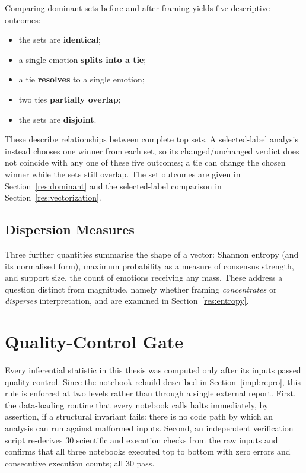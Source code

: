 Comparing dominant sets before and after framing yields five descriptive outcomes:

\begin{itemize}
    \item the sets are \textbf{identical};
    \item a single emotion \textbf{splits into a tie};
    \item a tie \textbf{resolves} to a single emotion;
    \item two ties \textbf{partially overlap};
    \item the sets are \textbf{disjoint}.
\end{itemize}

\noindent
These describe relationships between complete top sets. A selected-label analysis instead
chooses one winner from each set, so its changed/unchanged verdict does not coincide with any one
of these five outcomes; a tie can change the chosen winner while the sets still overlap. The set
outcomes are given in Section~\ref{res:dominant} and the selected-label comparison in
Section~\ref{res:vectorization}.

\subsection{Dispersion Measures}
\label{impl:dispersion}

\noindent
Three further quantities summarise the shape of a vector: Shannon entropy (and its normalised
form), maximum probability as a measure of consensus strength, and support size, the count of
emotions receiving any mass. These address a question distinct from magnitude, namely whether
framing \emph{concentrates} or \emph{disperses} interpretation, and are examined in
Section~\ref{res:entropy}.

\section{Quality-Control Gate}
\label{impl:qc}

\noindent
Every inferential statistic in this thesis was computed only after its inputs passed quality
control. Since the notebook rebuild described in Section~\ref{impl:repro}, this rule is enforced
at two levels rather than through a single external report. First, the data-loading routine that
every notebook calls halts immediately, by assertion, if a structural invariant fails: there is no
code path by which an analysis can run against malformed inputs. Second, an independent
verification script re-derives 30 scientific and execution checks from the raw inputs and confirms
that all three notebooks executed top to bottom with zero errors and consecutive execution counts;
all 30 pass.

